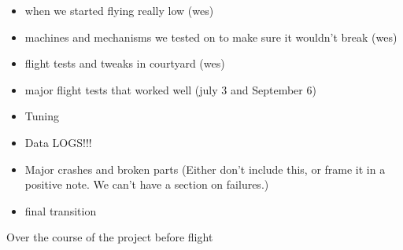 \color{red}
\begin{itemize}
\item when we started flying really low (wes) 
\item machines and mechanisms we tested on to make sure it wouldn’t break (wes) 
\item flight tests and tweaks in courtyard (wes) 
\item major flight tests that worked well (july 3 and September 6) 
\item Tuning 
\item Data LOGS!!! 
\item Major crashes and broken parts (Either don't include this, or frame it in a positive note. We can't have a section on failures.)
\item final transition
\end{itemize}
\color{black}
Over the course of the project before flight 